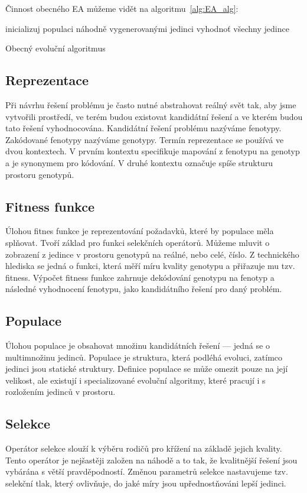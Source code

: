 Činnost obecného EA můžeme vidět na algoritmu~\ref{alg:EA_alg}:


\begin{algorithm}[H]
    inicializuj populaci náhodně vygenerovanými jedinci\;
    vyhodnoť všechny jedince\;
    \caption{Obecný evoluční algoritmus}
    \label{alg:EA_alg}
\end{algorithm}

\subsection{Reprezentace}
Při návrhu řešení problému je často nutné abstrahovat reálný svět tak, aby jsme vytvořili prostředí, ve terém budou existovat kandidátní řešení a ve kterém budou tato řešení vyhodnocována.
Kandidátní řešení problému nazýváme fenotypy.
Zakódované fenotypy nazýváme genotypy.
Termín reprezentace se používá ve dvou kontextech.
V prvním kontextu specifikuje mapování z fenotypu na genotyp a je synonymem pro kódování.
V druhé kontextu označuje spíše strukturu prostoru genotypů.

\subsection{Fitness funkce}
Úlohou fitnes funkce je reprezentování požadavků, které by populace měla splňovat.
Tvoří základ pro funkci selekčních operátorů.
Můžeme mluvit o zobrazení z jedince v prostoru genotypů na reálné, nebo celé, číslo.
Z technického hlediska se jedná o funkci, která měří míru kvality genotypu a přiřazuje mu tzv. fitness.
Výpočet fitness funkce zahrnuje dekódování genotypu na fenotyp a následné vyhodnocení fenotypu, jako kandidátního řešení pro daný problém.

\subsection{Populace}
Úlohou populace je obsahovat množinu kandidátních řešení --- jedná se o multimnožinu jedinců.
Populace je struktura, která podléhá evoluci, zatímco jedinci jsou statické struktury.
Definice populace se může omezit pouze na její velikost, ale existují i specializované evoluční algoritmy, které pracují i s rozložením jedinců v prostoru.


\subsection{Selekce}
Operátor selekce slouží k výběru rodičů pro křížení na základě jejich kvality.
Tento operátor je nejšastěji založen na náhodě a to tak, že kvalitnější řešení jsou vybárána s větší pravděpodností.
Změnou parametrů selekce nastavujeme tzv. selekční tlak, který ovlivňuje, do jaké míry jsou upřednostňováni lepší jedinci.

